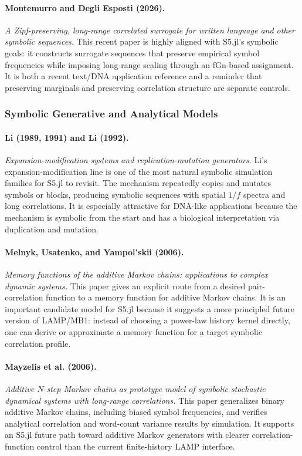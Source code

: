 \documentclass[11pt]{article}
\begin{document}
\paragraph{Montemurro and Degli Esposti (2026).}
\emph{A Zipf-preserving, long-range correlated surrogate for written language
and other symbolic sequences.}
This recent paper is highly aligned with S5.jl's symbolic goals: it constructs
surrogate sequences that preserve empirical symbol frequencies while imposing
long-range scaling through an fGn-based assignment. It is both a recent text/DNA
application reference and a reminder that preserving marginals and preserving
correlation structure are separate controls.

\subsubsection{Symbolic Generative and Analytical Models}

\paragraph{Li (1989, 1991) and Li (1992).}
\emph{Expansion-modification systems and replication-mutation generators.}
Li's expansion-modification line is one of the most natural symbolic simulation
families for S5.jl to revisit. The mechanism repeatedly copies and mutates
symbols or blocks, producing symbolic sequences with spatial $1/f$ spectra and
long correlations. It is especially attractive for DNA-like applications because
the mechanism is symbolic from the start and has a biological interpretation via
duplication and mutation.

\paragraph{Melnyk, Usatenko, and Yampol'skii (2006).}
\emph{Memory functions of the additive Markov chains: applications to complex
dynamic systems.}
This paper gives an explicit route from a desired pair-correlation function to a
memory function for additive Markov chains. It is an important candidate model
for S5.jl because it suggests a more principled future version of LAMP/MB1:
instead of choosing a power-law history kernel directly, one can derive or
approximate a memory function for a target symbolic correlation profile.

\paragraph{Mayzelis et al. (2006).}
\emph{Additive $N$-step Markov chains as prototype model of symbolic stochastic
dynamical systems with long-range correlations.}
This paper generalizes binary additive Markov chains, including biased symbol
frequencies, and verifies analytical correlation and word-count variance results
by simulation. It supports an S5.jl future path toward additive Markov generators
with clearer correlation-function control than the current finite-history LAMP
interface.
\end{document}
